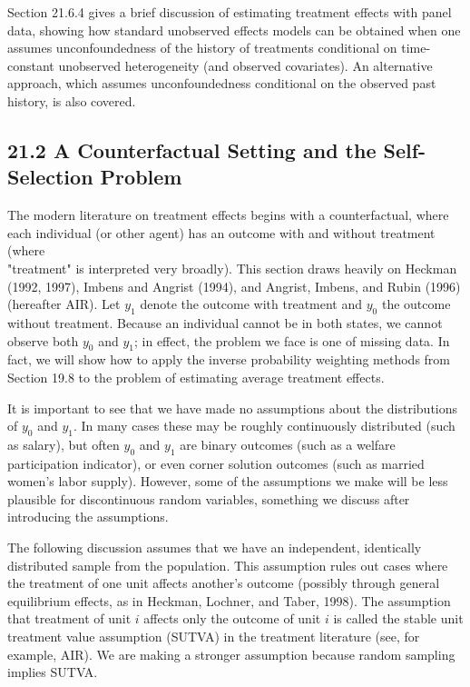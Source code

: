 \documentclass[10pt]{article}
\begin{document}
Section 21.6.4 gives a brief discussion of estimating treatment effects with panel data, showing how standard unobserved effects models can be obtained when one assumes unconfoundedness of the history of treatments conditional on time-constant unobserved heterogeneity (and observed covariates). An alternative approach, which assumes unconfoundedness conditional on the observed past history, is also covered.

\subsection*{21.2 A Counterfactual Setting and the Self-Selection Problem}
The modern literature on treatment effects begins with a counterfactual, where each individual (or other agent) has an outcome with and without treatment (where\\
"treatment" is interpreted very broadly). This section draws heavily on Heckman (1992, 1997), Imbens and Angrist (1994), and Angrist, Imbens, and Rubin (1996) (hereafter AIR). Let $y_{1}$ denote the outcome with treatment and $y_{0}$ the outcome without treatment. Because an individual cannot be in both states, we cannot observe both $y_{0}$ and $y_{1}$; in effect, the problem we face is one of missing data. In fact, we will show how to apply the inverse probability weighting methods from Section 19.8 to the problem of estimating average treatment effects.

It is important to see that we have made no assumptions about the distributions of $y_{0}$ and $y_{1}$. In many cases these may be roughly continuously distributed (such as salary), but often $y_{0}$ and $y_{1}$ are binary outcomes (such as a welfare participation indicator), or even corner solution outcomes (such as married women's labor supply). However, some of the assumptions we make will be less plausible for discontinuous random variables, something we discuss after introducing the assumptions.

The following discussion assumes that we have an independent, identically distributed sample from the population. This assumption rules out cases where the treatment of one unit affects another's outcome (possibly through general equilibrium effects, as in Heckman, Lochner, and Taber, 1998). The assumption that treatment of unit $i$ affects only the outcome of unit $i$ is called the stable unit treatment value assumption (SUTVA) in the treatment literature (see, for example, AIR). We are making a stronger assumption because random sampling implies SUTVA.
\end{document}
